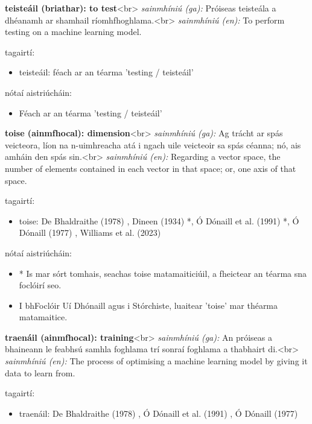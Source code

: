\documentclass{article}
\begin{document}
\textbf{teisteáil (briathar): to test}<br>
\textit{sainmhíniú (ga):} Próiseas teisteála a dhéanamh ar shamhail ríomhfhoghlama.<br>
\textit{sainmhíniú (en):} To perform testing on a machine learning model.

tagairtí:
\begin{itemize}
	\item teisteáil: féach ar an téarma 'testing / teisteáil'
\end{itemize}

nótaí aistriúcháin:
\begin{itemize}
	\item Féach ar an téarma 'testing / teisteáil'
\end{itemize}


\textbf{toise (ainmfhocal): dimension}<br>
\textit{sainmhíniú (ga):} Ag trácht ar spás veicteora, líon na n-uimhreacha atá i ngach uile veicteoir sa spás céanna; nó, ais amháin den spás sin.<br>
\textit{sainmhíniú (en):} Regarding a vector space, the number of elements contained in each vector in that space; or, one axis of that space.

tagairtí:
\begin{itemize}
	\item toise: De Bhaldraithe (1978) \cite{de-bhaldraithe}, Dineen (1934) \cite{dineen}*, Ó Dónaill et al. (1991) \cite{focloir-beag}*, Ó Dónaill (1977) \cite{odonaill}, Williams et al. (2023) \cite{storchiste}
\end{itemize}

nótaí aistriúcháin:
\begin{itemize}
	\item * Is mar sórt tomhais, seachas toise matamaiticiúil, a fheictear an téarma sna foclóirí seo.
	\item I bhFoclóir Uí Dhónaill agus i Stórchiste, luaitear 'toise' mar théarma matamaitice.
\end{itemize}


\textbf{traenáil (ainmfhocal): training}<br>
\textit{sainmhíniú (ga):} An próiseas a bhaineann le feabhsú samhla foghlama trí sonraí foghlama a thabhairt di.<br>
\textit{sainmhíniú (en):} The process of optimising a machine learning model by giving it data to learn from.

tagairtí:
\begin{itemize}
	\item traenáil: De Bhaldraithe (1978) \cite{de-bhaldraithe}, Ó Dónaill et al. (1991) \cite{focloir-beag}, Ó Dónaill (1977) \cite{odonaill}
\end{itemize}
\end{document}
